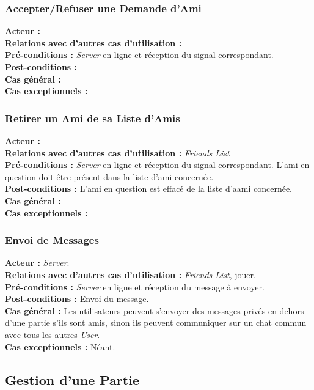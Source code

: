 \documentclass[10pt, a4paper]{article}
\begin{document}
\subsubsection{Accepter/Refuser une Demande d'Ami}
\textbf{Acteur :} \\
\textbf{Relations avec d'autres cas d'utilisation :} \\
\textbf{Pré-conditions :} \textit{Server} en ligne et réception du signal correspondant.\\
\textbf{Post-conditions :} \\
\textbf{Cas général :} \\
\textbf{Cas exceptionnels :}

\subsubsection{Retirer un Ami de sa Liste d'Amis}
\textbf{Acteur :} \\
\textbf{Relations avec d'autres cas d'utilisation :} \textit{Friends List} \\
\textbf{Pré-conditions :} \textit{Server} en ligne et réception du signal correspondant. L'ami en question doit être présent dans la liste d'ami concernée.\\
\textbf{Post-conditions :} L'ami en question est effacé de la liste d'aami concernée.\\
\textbf{Cas général :} \\
\textbf{Cas exceptionnels :}

\subsubsection{Envoi de Messages}
\textbf{Acteur :} \textit{Server}. \\
\textbf{Relations avec d'autres cas d'utilisation :} \textit{Friends List}, jouer. \\
\textbf{Pré-conditions :} \textit{Server} en ligne et réception du message à envoyer. \\
\textbf{Post-conditions :} Envoi du message. \\
\textbf{Cas général :} Les utilisateurs peuvent s'envoyer des messages privés en dehors d'une partie s'ils sont amis, sinon ils peuvent communiquer sur un chat commun avec tous les autres \textit{User}. \\
\textbf{Cas exceptionnels :} Néant. \\

\subsection{Gestion d'une Partie}
\end{document}
